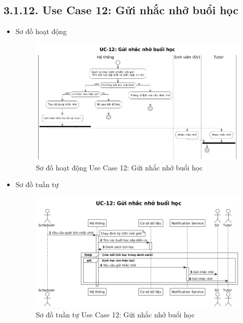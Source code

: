 \subsection*{3.1.12. Use Case 12: Gửi nhắc nhở buổi học}
\begin{itemize}
    \item Sơ đồ hoạt động
    \begin{figure}[H]
    \centering
    \includegraphics[scale=0.4 ]{Picture/ACUC12.png}
    \caption{Sơ đồ hoạt động Use Case 12: Gửi nhắc nhở buổi học}
    \end{figure}
    \item Sơ đồ tuần tự
    \begin{figure}[H]
    \centering
    \includegraphics[scale=0.4 ]{Picture/SEUC12.png}
    \caption{Sơ đồ tuần tự Use Case 12: Gửi nhắc nhở buổi học}
    \end{figure}
\end{itemize}
